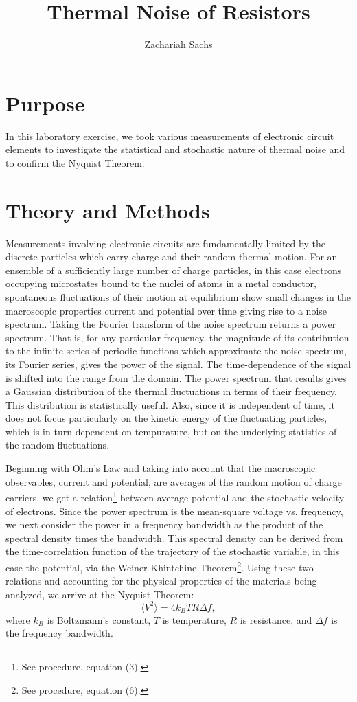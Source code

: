 \documentclass{article}
\title{Thermal Noise of Resistors}
\author{Zachariah Sachs}
\begin{document}
\maketitle
\section{Purpose}
In this laboratory
exercise, we took various measurements of electronic circuit
elements to investigate the statistical and stochastic nature of
thermal noise and to confirm the Nyquist Theorem.

\section{Theory and Methods}

Measurements involving electronic circuits are fundamentally
limited by the discrete particles which carry charge and their
random thermal motion. For an ensemble of a sufficiently large
number of charge particles, in this case electrons occupying
microstates bound to the nuclei of atoms in a metal conductor,
spontaneous fluctuations of their motion at equilibrium show
small changes in the macroscopic properties current and
potential over time giving rise to a noise spectrum. Taking the
Fourier transform of the noise spectrum returns a power
spectrum. That is, for any particular frequency, the magnitude
of its contribution to the infinite series of periodic functions
which approximate the noise spectrum, its Fourier series, gives
the power of the signal. The time-dependence of the signal is
shifted into the range from the domain. The power spectrum that
results gives a Gaussian distribution of the thermal
fluctuations in terms of their frequency. This distribution is
statistically useful. Also, since it is independent of time, it
does not focus particularly on the kinetic energy of the
fluctuating particles, which is in turn dependent on
tempurature, but on the underlying statistics of the random
fluctuations.

Beginning with Ohm's Law and taking into account that the
macroscopic observables, current and potential, are averages of
the random motion of charge carriers, we get a
relation\footnote{See procedure, equation (3).} between average
potential and the stochastic velocity of electrons. Since the
power spectrum is the mean-square voltage vs. frequency, we next
consider the power in a frequency bandwidth as the product of
the spectral density times the bandwidth. This spectral density
can be derived from the time-correlation function of the
trajectory of the stochastic variable, in this case the
potential, via the Weiner-Khintchine Theorem\footnote{See
procedure, equation (6).}. Using these two relations and
accounting for the physical properties of the materials being
analyzed, we arrive at the Nyquist Theorem: \begin{equation}
\langle V^2\rangle=4 k_B T R \Delta f, \end{equation} where
$k_B$ is Boltzmann's constant, $T$ is temperature, $R$ is
resistance, and $\Delta f$ is the frequency bandwidth.
\end{document}
